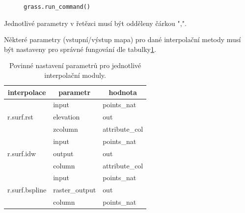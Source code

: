 \documentclass[a4paper,12pt,oneside]{report}
\begin{document}
\begin{figure}[h!]
\begin{footnotesize}
\lstset{extendedchars=false,
escapeinside=''}
\begin{lstlisting}[style=mybash]
grass.run_command()                                                           
\end{lstlisting}
\end{footnotesize}
\end{figure}
Jednotlivé parametry v řetězci musí být odděleny čárkou ",".

Některé parametry (vstupní/výstup mapa) pro dané interpolační metody musí být nastaveny pro správné fungování dle tabulky\ref{tab:interpol}.


\begin{table}[h]
\centering
\begin{tabular}{|lll|}
\hline
\multicolumn{1}{|c}{interpolace} & \multicolumn{1}{c}{parametr} & \multicolumn{1}{c|}{hodnota} \\ \hline\hline
\multirow{3}{*}{r.surf.rst}      & input                        & points\_nat                  \\
                                 & elevation                    & out                          \\
                                 & zcolumn                      & attribute\_col               \\\hline
\multirow{3}{*}{r.surf.idw}      & input                        & points\_nat                  \\
                                 & output                       & out                          \\
                                 & column                       & attribute\_col               \\\hline
\multirow{3}{*}{r.surf.bspline}  & input                        & points\_nat                  \\
                                 & raster\_output               & out                          \\
                                 & column                       & points\_nat                  \\ \hline
\end{tabular}
\caption{Povinné nastavení parametrů pro jednotlivé interpolační moduly.}
\label{tab:interpol}
\end{table}
\end{document}
